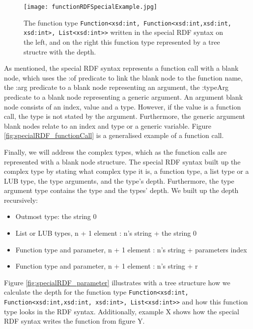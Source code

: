 \begin{figure}
  \centering
  \begin{minipage}{.5\textwidth}
    \centering
    
  \end{minipage}%
  \begin{minipage}{.5\textwidth}
    \centering
    \texttt{[image: functionRDFSpecialExample.jpg]}
  \end{minipage}
  \label{fig:specialRDFSyntax example}
    \caption[Function type in the special RDF synta]{The function type \lstinline{Function<xsd:int, Function<xsd:int,xsd:int, xsd:int>, List<xsd:int>>} written in the special RDF syntax on the left, and on the right this function type represented by a tree structre with the depth. }
\end{figure}

\para
As mentioned, the special RDF syntax represents a function call with a blank node, which uses the :of predicate to link the blank node to the function name, the :arg predicate to a blank node representing an argument, the :typeArg predicate to a blank node representing a generic argument. An argument blank node consists of an index, value and a type. However, if the value is a function call, the type is not stated by the argument. Furthermore, the generic argument blank nodes relate to an index and type or a generic variable. Figure \ref{fig:specialRDF_functionCall} is a generalised example of a function call. 

\para
Finally, we will address the complex types, which as the function calls are represented with a blank node structure. The special RDF syntax built up the complex type by stating what complex type it is, a function type, a list type or a LUB type, the type arguments, and the type's depth. Furthermore, the type argument type contains the type and the types' depth. We built up the depth recursively:
\begin{itemize}
  \item Outmost type: the string 0
  \item List or LUB types, n + 1 element : n's string +  the string 0
  \item Function type and parameter, n + 1 element : n's string + parameters index 
  \item Function type and parameter, n + 1 element : n's string + r
\end{itemize}
Figure \ref{fig:specialRDF_parameter} illustrates with a tree structure how we calculate the depth for the function type \lstinline{Function<xsd:int, Function<xsd:int,xsd:int, xsd:int>, List<xsd:int>>} and how this function type looks in the RDF syntax. Additionally, example X shows how the special RDF syntax writes the function from figure Y. 


